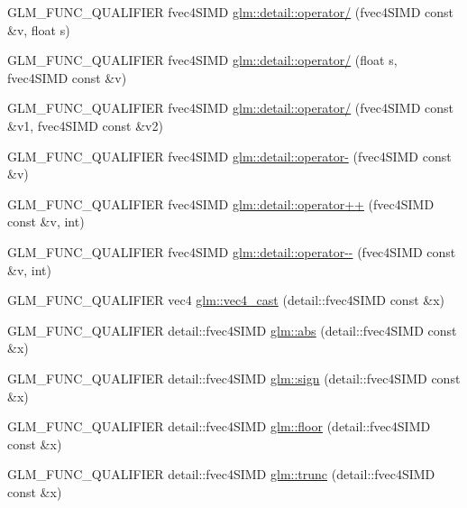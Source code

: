 \begin{DoxyCompactItemize}
\item 
G\+L\+M\+\_\+\+F\+U\+N\+C\+\_\+\+Q\+U\+A\+L\+I\+F\+I\+E\+R fvec4\+S\+I\+M\+D \hyperlink{namespaceglm_1_1detail_af8a63b3b0eb2a7c3f59120bb4e160a76}{glm\+::detail\+::operator/} (fvec4\+S\+I\+M\+D const \&v, float s)
\item 
G\+L\+M\+\_\+\+F\+U\+N\+C\+\_\+\+Q\+U\+A\+L\+I\+F\+I\+E\+R fvec4\+S\+I\+M\+D \hyperlink{namespaceglm_1_1detail_ac19446d5d6cc38cac352c5c6b802ab81}{glm\+::detail\+::operator/} (float s, fvec4\+S\+I\+M\+D const \&v)
\item 
G\+L\+M\+\_\+\+F\+U\+N\+C\+\_\+\+Q\+U\+A\+L\+I\+F\+I\+E\+R fvec4\+S\+I\+M\+D \hyperlink{namespaceglm_1_1detail_aefac49f641fdbfa4140c9465cf30a625}{glm\+::detail\+::operator/} (fvec4\+S\+I\+M\+D const \&v1, fvec4\+S\+I\+M\+D const \&v2)
\item 
G\+L\+M\+\_\+\+F\+U\+N\+C\+\_\+\+Q\+U\+A\+L\+I\+F\+I\+E\+R fvec4\+S\+I\+M\+D \hyperlink{namespaceglm_1_1detail_a0fd34f78cac49e112724c4fc71a4837c}{glm\+::detail\+::operator-\/} (fvec4\+S\+I\+M\+D const \&v)
\item 
G\+L\+M\+\_\+\+F\+U\+N\+C\+\_\+\+Q\+U\+A\+L\+I\+F\+I\+E\+R fvec4\+S\+I\+M\+D \hyperlink{namespaceglm_1_1detail_a2434183491dc1c79ecd2860e789978f5}{glm\+::detail\+::operator++} (fvec4\+S\+I\+M\+D const \&v, int)
\item 
G\+L\+M\+\_\+\+F\+U\+N\+C\+\_\+\+Q\+U\+A\+L\+I\+F\+I\+E\+R fvec4\+S\+I\+M\+D \hyperlink{namespaceglm_1_1detail_aa03040a975ab9847d84e843caa13ec86}{glm\+::detail\+::operator-\/-\/} (fvec4\+S\+I\+M\+D const \&v, int)
\item 
G\+L\+M\+\_\+\+F\+U\+N\+C\+\_\+\+Q\+U\+A\+L\+I\+F\+I\+E\+R vec4 \hyperlink{namespaceglm_a8fd3f484b1badc1724ab65dc9714ad6c}{glm\+::vec4\+\_\+cast} (detail\+::fvec4\+S\+I\+M\+D const \&x)
\item 
G\+L\+M\+\_\+\+F\+U\+N\+C\+\_\+\+Q\+U\+A\+L\+I\+F\+I\+E\+R detail\+::fvec4\+S\+I\+M\+D \hyperlink{namespaceglm_a68109cc8f5b3e44fd65707fac87fb4d5}{glm\+::abs} (detail\+::fvec4\+S\+I\+M\+D const \&x)
\item 
G\+L\+M\+\_\+\+F\+U\+N\+C\+\_\+\+Q\+U\+A\+L\+I\+F\+I\+E\+R detail\+::fvec4\+S\+I\+M\+D \hyperlink{namespaceglm_af67d3ef2ca567fe890c09a8fa26328bf}{glm\+::sign} (detail\+::fvec4\+S\+I\+M\+D const \&x)
\item 
G\+L\+M\+\_\+\+F\+U\+N\+C\+\_\+\+Q\+U\+A\+L\+I\+F\+I\+E\+R detail\+::fvec4\+S\+I\+M\+D \hyperlink{namespaceglm_a96b854694bd3ae049376cbdba57f2599}{glm\+::floor} (detail\+::fvec4\+S\+I\+M\+D const \&x)
\item 
G\+L\+M\+\_\+\+F\+U\+N\+C\+\_\+\+Q\+U\+A\+L\+I\+F\+I\+E\+R detail\+::fvec4\+S\+I\+M\+D \hyperlink{namespaceglm_a9209720f29f7ce2e879af12191051927}{glm\+::trunc} (detail\+::fvec4\+S\+I\+M\+D const \&x)

\end{DoxyCompactItemize}
